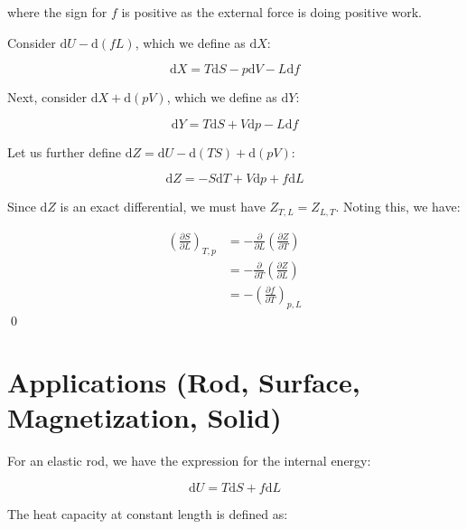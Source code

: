 \documentclass[12pt]{article}
\begin{document}
where the sign for $f$ is positive as the external force is doing positive work.

Consider $\mathrm{d}U - \mathrm{d}(fL)$, which we define as $\mathrm{d}X$:

\begin{equation}
    \mathrm{d}X = T\mathrm{d}S - p\mathrm{d}V - L\mathrm{d}f
\end{equation}

Next, consider $\mathrm{d}X + \mathrm{d}(pV)$, which we define as $\mathrm{d}Y$:

\begin{equation}
    \mathrm{d}Y = T\mathrm{d}S + V\mathrm{d}p - L\mathrm{d}f
\end{equation}

Let us further define $\mathrm{d}Z = \mathrm{d}U - \mathrm{d}(TS) + \mathrm{d}(pV)$:

\begin{equation}
    \mathrm{d}Z = -S\mathrm{d}T + V\mathrm{d}p + f\mathrm{d}L
\end{equation}

Since $\mathrm{d}Z$ is an exact differential, we must have $Z_{T, L} = Z_{L, T}$. Noting this, we have:

\begin{equation}
    \begin{split}
        \left( \frac{\partial S}{\partial L} \right)_{T, p} &= - \frac{\partial }{\partial L} \left( \frac{\partial Z}{\partial T} \right) \\
        &= - \frac{\partial }{\partial T} \left( \frac{\partial Z}{\partial L} \right) \\
        &= - \left( \frac{\partial f}{\partial T} \right)_{p, L}
    \end{split}
\end{equation}
\qed


\pagebreak
\section*{Applications (Rod, Surface, Magnetization, Solid)}


For an elastic rod, we have the expression for the internal energy:

\begin{equation}
    \mathrm{d}U = T\mathrm{d}S + f\mathrm{d}L
\end{equation}

The heat capacity at constant length is defined as:
\end{document}
